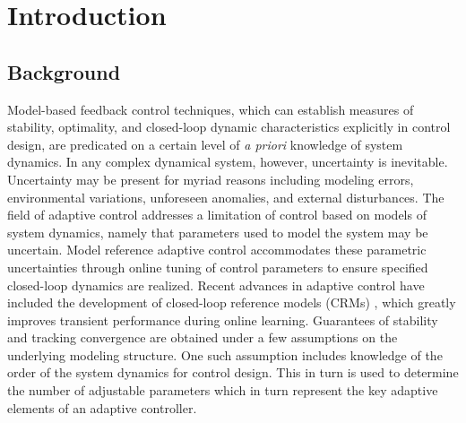 \chapter{Introduction} \label{ch:introduction}
\section{Background}
Model-based feedback control techniques, which can establish measures of stability, optimality, and closed-loop dynamic characteristics explicitly in control design, are predicated on a certain level of \textit{a priori} knowledge of system dynamics. In any complex dynamical system, however, uncertainty is inevitable. Uncertainty may be present for myriad reasons including modeling errors, environmental variations, unforeseen anomalies, and external disturbances. The field of adaptive control addresses a limitation of control based on models of system dynamics, namely that parameters used to model the system may be uncertain. Model reference adaptive control \cite{narendra2012stable, lavretsky2013robust} accommodates these parametric uncertainties through online tuning of control parameters to ensure specified closed-loop dynamics are realized. Recent advances in adaptive control have included the development of closed-loop reference models (CRMs) \cite{gibson2013adaptive}, which greatly improves transient performance during online learning. Guarantees of stability and tracking convergence are obtained under a few assumptions on the underlying modeling structure. One such assumption includes knowledge of the order of the system dynamics for control design. This in turn is used to determine the number of adjustable parameters which in turn represent the key adaptive elements of an adaptive controller.

